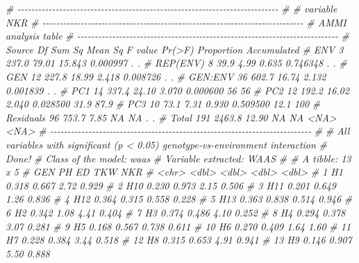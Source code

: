 \documentclass[
]{book}
\newenvironment{Shaded}{\begin{snugshade}}{\end{snugshade}}
\newcommand{\CommentTok}[1]{\textcolor[rgb]{0.56,0.35,0.01}{\textit{#1}}}
\numberwithin{equation}{section}
\begin{document}
\begin{Shaded}
\begin{Highlighting}[]
\CommentTok{\# {-}{-}{-}{-}{-}{-}{-}{-}{-}{-}{-}{-}{-}{-}{-}{-}{-}{-}{-}{-}{-}{-}{-}{-}{-}{-}{-}{-}{-}{-}{-}{-}{-}{-}{-}{-}{-}{-}{-}{-}{-}{-}{-}{-}{-}{-}{-}{-}{-}{-}{-}{-}{-}{-}{-}{-}{-}{-}{-}{-}{-}{-}{-}{-}{-}{-}{-}{-}{-}{-}{-}{-}{-}{-}{-}}
\CommentTok{\# }
\CommentTok{\# variable NKR }
\CommentTok{\# {-}{-}{-}{-}{-}{-}{-}{-}{-}{-}{-}{-}{-}{-}{-}{-}{-}{-}{-}{-}{-}{-}{-}{-}{-}{-}{-}{-}{-}{-}{-}{-}{-}{-}{-}{-}{-}{-}{-}{-}{-}{-}{-}{-}{-}{-}{-}{-}{-}{-}{-}{-}{-}{-}{-}{-}{-}{-}{-}{-}{-}{-}{-}{-}{-}{-}{-}{-}{-}{-}{-}{-}{-}{-}{-}}
\CommentTok{\# AMMI analysis table}
\CommentTok{\# {-}{-}{-}{-}{-}{-}{-}{-}{-}{-}{-}{-}{-}{-}{-}{-}{-}{-}{-}{-}{-}{-}{-}{-}{-}{-}{-}{-}{-}{-}{-}{-}{-}{-}{-}{-}{-}{-}{-}{-}{-}{-}{-}{-}{-}{-}{-}{-}{-}{-}{-}{-}{-}{-}{-}{-}{-}{-}{-}{-}{-}{-}{-}{-}{-}{-}{-}{-}{-}{-}{-}{-}{-}{-}{-}}
\CommentTok{\#     Source  Df Sum Sq Mean Sq F value   Pr(\textgreater{}F) Proportion Accumulated}
\CommentTok{\#        ENV   3  237.0   79.01  15.843 0.000997          .           .}
\CommentTok{\#   REP(ENV)   8   39.9    4.99   0.635 0.746348          .           .}
\CommentTok{\#        GEN  12  227.8   18.99   2.418 0.008726          .           .}
\CommentTok{\#    GEN:ENV  36  602.7   16.74   2.132 0.001839          .           .}
\CommentTok{\#        PC1  14  337.4   24.10   3.070 0.000600         56          56}
\CommentTok{\#        PC2  12  192.2   16.02   2.040 0.028500       31.9        87.9}
\CommentTok{\#        PC3  10   73.1    7.31   0.930 0.509500       12.1         100}
\CommentTok{\#  Residuals  96  753.7    7.85      NA       NA          .           .}
\CommentTok{\#      Total 191 2463.8   12.90      NA       NA       \textless{}NA\textgreater{}        \textless{}NA\textgreater{}}
\CommentTok{\# {-}{-}{-}{-}{-}{-}{-}{-}{-}{-}{-}{-}{-}{-}{-}{-}{-}{-}{-}{-}{-}{-}{-}{-}{-}{-}{-}{-}{-}{-}{-}{-}{-}{-}{-}{-}{-}{-}{-}{-}{-}{-}{-}{-}{-}{-}{-}{-}{-}{-}{-}{-}{-}{-}{-}{-}{-}{-}{-}{-}{-}{-}{-}{-}{-}{-}{-}{-}{-}{-}{-}{-}{-}{-}{-}}
\CommentTok{\# }
\CommentTok{\# All variables with significant (p \textless{} 0.05) genotype{-}vs{-}environment interaction}
\CommentTok{\# Done!}
\CommentTok{\# Class of the model: waas}
\CommentTok{\# Variable extracted: WAAS}
\CommentTok{\# \# A tibble: 13 x 5}
\CommentTok{\#    GEN      PH    ED   TKW   NKR}
\CommentTok{\#    \textless{}chr\textgreater{} \textless{}dbl\textgreater{} \textless{}dbl\textgreater{} \textless{}dbl\textgreater{} \textless{}dbl\textgreater{}}
\CommentTok{\#  1 H1    0.318 0.667 2.72  0.929}
\CommentTok{\#  2 H10   0.230 0.973 2.15  0.506}
\CommentTok{\#  3 H11   0.201 0.649 1.26  0.836}
\CommentTok{\#  4 H12   0.364 0.315 0.558 0.228}
\CommentTok{\#  5 H13   0.363 0.838 0.514 0.946}
\CommentTok{\#  6 H2    0.342 1.08  4.41  0.404}
\CommentTok{\#  7 H3    0.374 0.486 4.10  0.252}
\CommentTok{\#  8 H4    0.294 0.378 3.07  0.281}
\CommentTok{\#  9 H5    0.168 0.567 0.738 0.611}
\CommentTok{\# 10 H6    0.270 0.409 1.64  1.60 }
\CommentTok{\# 11 H7    0.228 0.384 3.44  0.518}
\CommentTok{\# 12 H8    0.315 0.653 4.91  0.941}
\CommentTok{\# 13 H9    0.146 0.907 5.50  0.888}
\end{Highlighting}
\end{Shaded}
\end{document}
